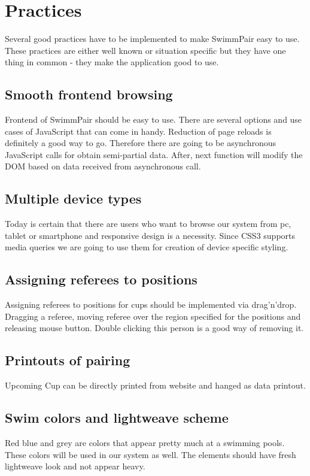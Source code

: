 \section{Practices}
Several good practices have to be implemented to make SwimmPair easy to use. These practices are either well known or situation specific but they have one thing in common - they make the application good to use.
\subsection*{Smooth frontend browsing}
\par
Frontend of SwimmPair should be easy to use. There are several options and use cases of JavaScript that can come in handy. Reduction of page reloads is definitely a good way to go. Therefore there are going to be asynchronous JavaScript calls for obtain semi-partial data. After, next function will modify the DOM based on data received from asynchronous call. 
\subsection*{Multiple device types}
\par
Today is certain that there are users who want to browse our system from pc, tablet or smartphone and responsive design is a necessity. Since CSS3 supports media queries we are going to use them for creation of device specific styling.
\subsection*{Assigning referees to positions}
\par
Assigning referees to positions for cups should be implemented via drag'n'drop. Dragging a referee, moving referee over the region specified for the positions and releasing mouse button. Double clicking this person is a good way of removing it.
\subsection*{Printouts of pairing}
Upcoming Cup can be directly printed from website and hanged as data printout. 
\subsection*{Swim colors and lightweave scheme}
\par
Red blue and grey are colors that appear pretty much at a swimming pools. These colors will be used in our system as well. The elements should have fresh lightweave look and not appear heavy.
